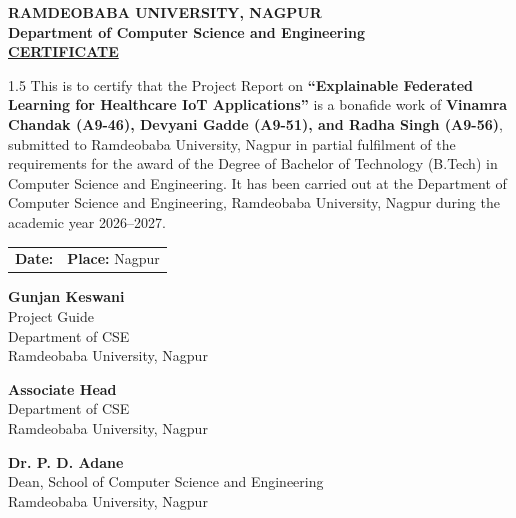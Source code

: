 \documentclass[12pt,a4paper,oneside]{report}
\begin{document}
\clearpage
\begin{center}
{\fontsize{14pt}{18pt}\bfseries\selectfont RAMDEOBABA UNIVERSITY, NAGPUR}\\[0.3em]
{\fontsize{12pt}{16pt}\bfseries\selectfont Department of Computer Science and Engineering}\\[1.5em]
{\fontsize{14pt}{18pt}\bfseries\selectfont \underline{CERTIFICATE}}\\[2.0em]
\end{center}

\begin{spacing}{1.5}
This is to certify that the Project Report on \textbf{``Explainable Federated Learning for Healthcare IoT Applications''} is a bonafide work of \textbf{Vinamra Chandak (A9-46), Devyani Gadde (A9-51), and Radha Singh (A9-56)}, submitted to Ramdeobaba University, Nagpur in partial fulfilment of the requirements for the award of the Degree of Bachelor of Technology (B.Tech) in Computer Science and Engineering. It has been carried out at the Department of Computer Science and Engineering, Ramdeobaba University, Nagpur during the academic year 2026--2027.
\end{spacing}

\vspace{3.5em}

\noindent
\begin{tabularx}{\textwidth}{Xr}
\textbf{Date:} \hspace{2cm} & \textbf{Place:} Nagpur
\end{tabularx}

\vspace{4.0em}

\noindent
\begin{minipage}[t]{0.48\textwidth}
\textbf{Gunjan Keswani}\\
Project Guide\\
Department of CSE\\
Ramdeobaba University, Nagpur
\end{minipage}
\hfill
\begin{minipage}[t]{0.48\textwidth}
\raggedleft
\textbf{Associate Head}\\
Department of CSE\\
Ramdeobaba University, Nagpur
\end{minipage}

\vspace{5.0em}
\begin{center}
\textbf{Dr. P. D. Adane}\\
Dean, School of Computer Science and Engineering\\
Ramdeobaba University, Nagpur
\end{center}
\end{document}
